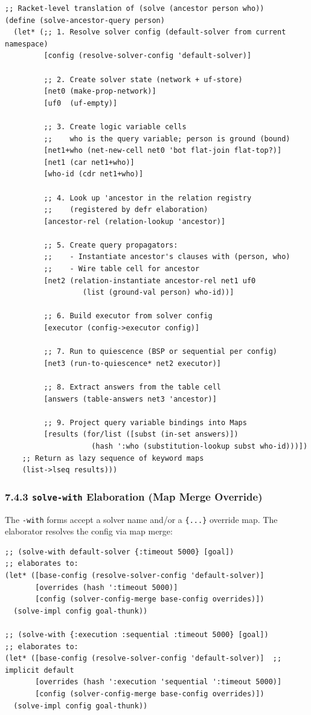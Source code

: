 \documentclass[11pt]{article}
\begin{document}
\begin{verbatim}
;; Racket-level translation of (solve (ancestor person who))
(define (solve-ancestor-query person)
  (let* (;; 1. Resolve solver config (default-solver from current namespace)
         [config (resolve-solver-config 'default-solver)]

         ;; 2. Create solver state (network + uf-store)
         [net0 (make-prop-network)]
         [uf0  (uf-empty)]

         ;; 3. Create logic variable cells
         ;;    who is the query variable; person is ground (bound)
         [net1+who (net-new-cell net0 'bot flat-join flat-top?)]
         [net1 (car net1+who)]
         [who-id (cdr net1+who)]

         ;; 4. Look up 'ancestor in the relation registry
         ;;    (registered by defr elaboration)
         [ancestor-rel (relation-lookup 'ancestor)]

         ;; 5. Create query propagators:
         ;;    - Instantiate ancestor's clauses with (person, who)
         ;;    - Wire table cell for ancestor
         [net2 (relation-instantiate ancestor-rel net1 uf0
                  (list (ground-val person) who-id))]

         ;; 6. Build executor from solver config
         [executor (config->executor config)]

         ;; 7. Run to quiescence (BSP or sequential per config)
         [net3 (run-to-quiescence* net2 executor)]

         ;; 8. Extract answers from the table cell
         [answers (table-answers net3 'ancestor)]

         ;; 9. Project query variable bindings into Maps
         [results (for/list ([subst (in-set answers)])
                    (hash ':who (substitution-lookup subst who-id)))])
    ;; Return as lazy sequence of keyword maps
    (list->lseq results)))
\end{verbatim}
\subsubsection{7.4.3 \texttt{solve-with} Elaboration (Map Merge Override)}
\label{sec:org38e1bbe}

The \texttt{-with} forms accept a solver name and/or a \texttt{\{...\}} override map.
The elaborator resolves the config via map merge:

\begin{verbatim}
;; (solve-with default-solver {:timeout 5000} [goal])
;; elaborates to:
(let* ([base-config (resolve-solver-config 'default-solver)]
       [overrides (hash ':timeout 5000)]
       [config (solver-config-merge base-config overrides)])
  (solve-impl config goal-thunk))

;; (solve-with {:execution :sequential :timeout 5000} [goal])
;; elaborates to:
(let* ([base-config (resolve-solver-config 'default-solver)]  ;; implicit default
       [overrides (hash ':execution 'sequential ':timeout 5000)]
       [config (solver-config-merge base-config overrides)])
  (solve-impl config goal-thunk))
\end{verbatim}
\end{document}
